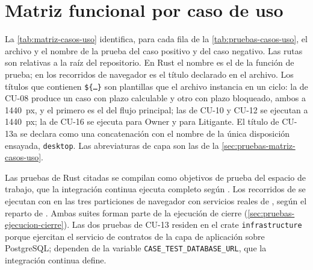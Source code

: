 \section{Matriz funcional por caso de uso}\label{anexo:casos-uso}

La \cref{tab:matriz-casos-uso} identifica, para cada fila de la \cref{tab:pruebas-casos-uso}, el archivo y el nombre de la prueba del caso positivo y del caso negativo. Las rutas son relativas a la raíz del repositorio. En Rust el nombre es el de la función de prueba; en los recorridos de navegador es el título declarado en el archivo. Los títulos que contienen \texttt{\$\{\ldots\}} son plantillas que el archivo instancia en un ciclo: la de CU-08 produce un caso con plazo calculable y otro con plazo bloqueado, ambos a 1440~px, y el primero es el del flujo principal; las de CU-10 y CU-12 se ejecutan a 1440~px; la de CU-16 se ejecuta para Owner y para Litigante. El título de CU-13a se declara como una concatenación con el nombre de la única disposición ensayada, \texttt{desktop}. Las abreviaturas de capa son las de la \cref{sec:pruebas-matriz-casos-uso}.

Las pruebas de Rust citadas se compilan como objetivos de prueba del espacio de trabajo, que la integración continua ejecuta completo según . Los recorridos de  se ejecutan con  en las tres particiones de navegador con servicios reales de , según el reparto de . Ambas suites forman parte de la ejecución de cierre (\cref{sec:pruebas-ejecucion-cierre}). Las dos pruebas de CU-13 residen en el crate \texttt{infrastructure} porque ejercitan el servicio de contratos de la capa de aplicación sobre PostgreSQL; dependen de la variable \texttt{CASE\_TEST\_DATABASE\_URL}, que la integración continua define.

\begingroup
\renewcommand{\_}{\textunderscore\allowbreak}

